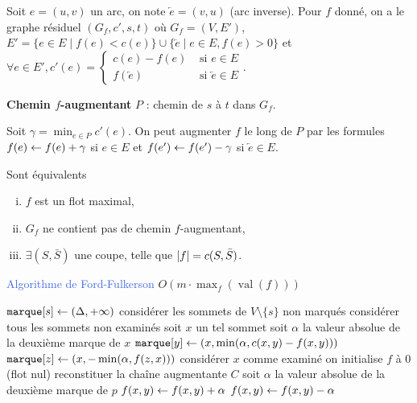 \documentclass[a4paper,11pt,twocolumn]{article}
\DeclareMathOperator{\val}{val}
\begin{document}
	\begin{note}
	Soit $e = (u,v)$ un arc, on note $\overleftarrow{e} = (v,u)$ (arc inverse).
	Pour $f$ donné, on a le graphe résiduel $(G_f,c',s,t)$ où $G_f = (V,E')$, $E' = \{ e \in E \mid f(e) < c(e) \} \cup \{ \overleftarrow{e} \mid e \in E, f(e) > 0 \}$ et $\forall e \in E', c'(e) = \left\{ \begin{array}{cl}
		c(e) - f(e) & \text{ si } e \in E \\
		f(\overleftarrow{e}) & \text{ si } \overleftarrow{e} \in E
	\end{array}\right.$.
	\end{note}

	\begin{defn}
	\textbf{Chemin $f$-augmentant} $P$ : chemin de $s$ à $t$ dans $G_f$.
	\end{defn}

	Soit $\gamma = \min_{e \in P} c'(e)$.
	On peut augmenter $f$ le long de $P$ par les formules $f(e) \leftarrow f(e) + \gamma$ si $e \in E$ et $f(e') \leftarrow f(e') - \gamma$ si $\overleftarrow{e} \in E$.

	\begin{thm}
	Sont équivalents
		\begin{enumerate}[i.]
		\item $f$ est un flot maximal,
		\item $G_f$ ne contient pas de chemin $f$-augmentant,
		\item $\exists (S,\bar{S})$ une coupe, telle que $\left\lvert f\right\rvert = c(S,\bar{S})$.
		\end{enumerate}
	\end{thm}


	\begin{algorithm}
	\caption{\textcolor{RoyalBlue}{Algorithme de Ford-Fulkerson} $O(m \cdot \max_f(\val(f)))$}
	\func{\rca{}}
	{
		$\texttt{marque}[s] \leftarrow (\Delta,+\infty)$ \;
		considérer les sommets de $V \setminus \{ s \}$ non marqués \;
		considérer tous les sommets non examinés \;
		{
			soit $x$ un tel sommet \;
			soit $\alpha$ la valeur absolue de la deuxième marque de $x$\;
			{
					{$\texttt{marque}[y] \leftarrow (x,\min(\alpha,c(x,y) - f(x,y)))$ \;}
			}
			{
					{$\texttt{marque}[z] \leftarrow (x,-\min(\alpha,f(z,x)))$\;}
			}
			considérer $x$ comme examiné \;
		}
	}
	on initialise $f$ à $0$ (flot nul) \;
	\rca{} \;
	{
		reconstituer la chaîne augmentante $C$ \;
		soit $\alpha$ la valeur absolue de la deuxième marque de $p$\;
		{
			$f(x,y) \leftarrow f(x,y) + \alpha$ \;
		}
		{
			$f(x,y) \leftarrow f(x,y) - \alpha$ \;
		}
		\rca{} \;
	}
	\end{algorithm}
\end{document}
